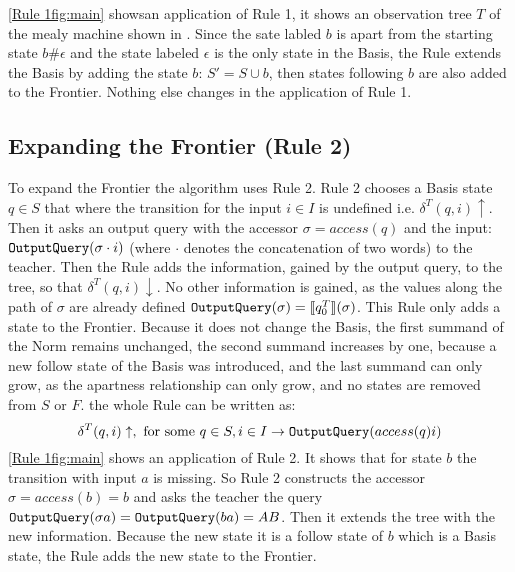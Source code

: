 \autoref{Rule 1fig:main} showsan application of Rule 1, it shows an observation tree $T$ of the mealy machine shown in . Since the sate labled $b$ is apart from the starting state $b\#\epsilon$ and the state labeled $\epsilon$ is the only state in the Basis, the Rule extends the Basis by adding the state $b$: $S'=S\cup{b}$, then states following $b$ are also added to the Frontier. Nothing else changes in the application of Rule 1.

\subsection{Expanding the Frontier (Rule 2)}
To expand the Frontier the algorithm uses Rule 2. Rule 2 chooses a Basis state $q\in S$ that where the transition for the input $i\in I$ is undefined i.e. $\delta^T(q,i)\uparrow$. Then it asks an output query with the accessor $\sigma=access(q)$ and the input: $\textnormal{\texttt{OutputQuery}}(\sigma\cdot i)$ (where $\cdot$ denotes the concatenation of two words) to the teacher. Then the Rule adds the information, gained by the output query, to the tree, so that $\delta^T(q,i)\downarrow$. No other information is gained, as the values along the path of $\sigma$ are already defined $\textnormal{\texttt{OutputQuery}}(\sigma)=\llbracket q_0^T\rrbracket(\sigma)$. This Rule only adds a state to the Frontier. Because it does not change the Basis, the first summand of the Norm remains unchanged, the second summand increases by one, because a new follow state of the Basis was introduced, and the last summand can only grow, as the apartness relationship can only grow, and no states are removed from $S$ or $F$. the whole Rule can be written as:
$$
\delta^T(q,i)\uparrow, \text{ for some } q\in S, i\in I\rightarrow \texttt{\textnormal{\texttt{OutputQuery}}}(access(q)i)
$$
\autoref{Rule 1fig:main} shows an application of Rule 2. It shows that for state $b$ the transition with input $a$ is missing. So Rule 2 constructs the accessor $\sigma=access(b)=b$ and asks the teacher the query $\textnormal{\texttt{OutputQuery}}(\sigma a)=\textnormal{\texttt{OutputQuery}}(ba)=AB$. Then it extends the tree with the new information. Because the new state it is a follow state of $b$ which is a Basis state, the Rule adds the new state to the Frontier.
